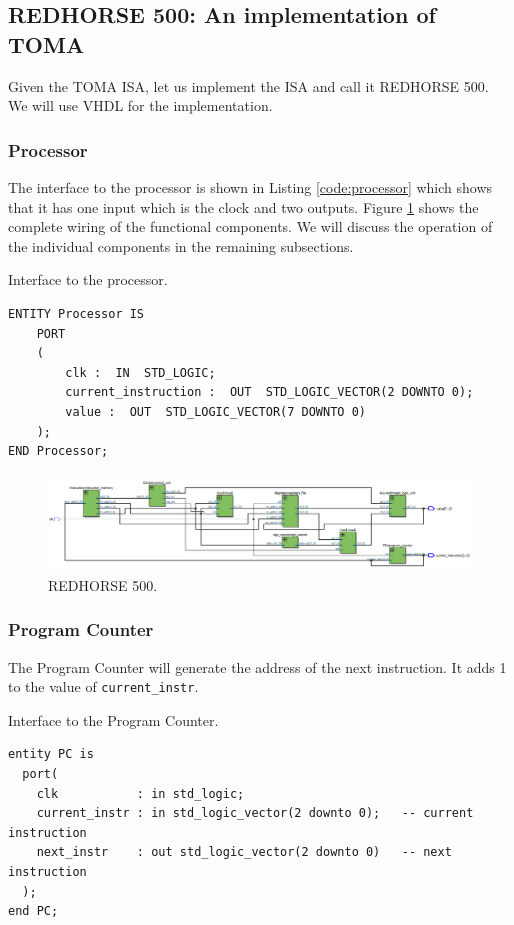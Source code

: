 \documentclass[a4paper, 11pt,oneside]{article}
\begin{document}
\subsection{REDHORSE 500: An implementation of TOMA}
Given the TOMA ISA, let us implement the ISA and call it REDHORSE 500. We will 
use VHDL for the implementation.

\subsubsection{Processor}
The interface to the processor is shown in Listing \ref{code:processor} which 
shows that it has one input which is the clock and two outputs. Figure 
\ref{fig:redhorse500} shows the complete wiring of the functional components. 
We will discuss the operation of the individual components in the remaining 
subsections. 

\begin{listing}[H]
\caption{Interface to the processor.}
\label{code:processor}
\begin{verbatim}
ENTITY Processor IS 
    PORT
    (
        clk :  IN  STD_LOGIC;
        current_instruction :  OUT  STD_LOGIC_VECTOR(2 DOWNTO 0);
        value :  OUT  STD_LOGIC_VECTOR(7 DOWNTO 0)
    );
END Processor;
\end{verbatim}
\end{listing}

\begin{landscape}
\thispagestyle{plain}
\begin{figure}[H]
	\begin{center}
	\includegraphics[width=10.5in]{redhorse500.png}
	\caption{REDHORSE 500.}
	\label{fig:redhorse500} 
	\end{center}
\end{figure}
\end{landscape}

\subsubsection{Program Counter}
The Program Counter will generate the address of the next instruction. It adds 
1 to the value of \texttt{current_instr}.
\begin{listing}[H]
\caption{Interface to the Program Counter.}
\label{code:pc}
\begin{verbatim}
entity PC is
  port(
    clk           : in std_logic;
    current_instr : in std_logic_vector(2 downto 0);   -- current instruction
    next_instr    : out std_logic_vector(2 downto 0)   -- next instruction
  );
end PC;
\end{verbatim}
\end{listing}
\end{document}
